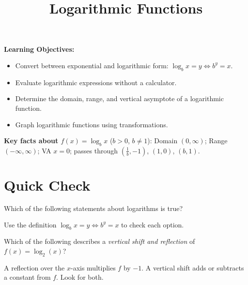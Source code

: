 \documentclass{ximera}
\title{Logarithmic Functions}
\begin{document}
\begin{abstract}
\end{abstract}
\maketitle

\textbf{Learning Objectives:}
\begin{itemize}
  \item Convert between exponential and logarithmic form: $\log_b x = y \Longleftrightarrow b^y = x$.
  \item Evaluate logarithmic expressions without a calculator.
  \item Determine the domain, range, and vertical asymptote of a logarithmic function.
  \item Graph logarithmic functions using transformations.
\end{itemize}
\medskip

\noindent\textbf{Key facts about $f(x)=\log_b x$} ($b>0$, $b\neq1$): Domain $(0,\infty)$; Range $(-\infty,\infty)$; VA $x=0$; passes through $(\tfrac{1}{b},-1)$, $(1,0)$, $(b,1)$.

\bigskip
\section*{Quick Check}

\begin{problem}
Which of the following statements about logarithms is true?
\begin{hint}
Use the definition $\log_b x = y \Longleftrightarrow b^y = x$ to check each option.
\end{hint}
\begin{multipleChoice}
\end{multipleChoice}
\end{problem}

\begin{problem}
Which of the following describes a \emph{vertical shift and reflection} of $f(x) = \log_2(x)$?
\begin{hint}
A reflection over the $x$-axis multiplies $f$ by $-1$. A vertical shift adds or subtracts a constant from $f$. Look for both.
\end{hint}
\begin{multipleChoice}
\end{multipleChoice}
\end{problem}
\end{document}

